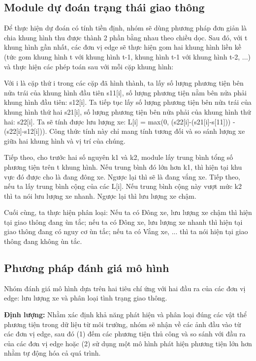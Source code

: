 \subsection{Module dự đoán trạng thái giao thông}

\quad Để thực hiện dự đoán có tính tiền định, nhóm sẽ dùng phương pháp đơn giản là chia khung hình thu được thành 2 phần bằng nhau theo chiều dọc. Sau đó, với t khung hình gần nhất, các đơn vị edge sẽ thực hiện gom hai khung hình liền kề (tức gom khung hình t với khung hình t-1, khung hình t-1 với khung hình t-2, ...) và thực hiện các phép toán sau với mỗi cặp khung hình:

\quad Với i là cặp thứ i trong các cặp đã hình thành, ta lấy số lượng phương tiện bên nửa trái của khung hình đầu tiên s11[i], số lượng phương tiện nằm bên nửa phải khung hình đầu tiên: s12[i]. Ta tiếp tục lấy số lượng phương tiện bên nửa trái của khung hình thứ hai s21[i], số lượng phương tiện bên nửa phải của khung hình thứ hai: s22[i]. Ta sẽ tính được lưu lượng xe: L[i] = max(0, (s22[i]-(s21[i]-s[11])) - (s22[i]-s12[i])). Công thức tính này chỉ mang tính tương đối và so sánh lượng xe giữa hai khung hình và vị trí của chúng.

\quad Tiếp theo, cho trước hai số nguyên k1 và k2, module lấy trung bình tổng số phương tiện trên t khung hình. Nếu trung bình đó lớn hơn k1, thì hiện tại khu vực đó được cho là đang đông xe. Ngược lại thì sẽ là đang vắng xe. Tiếp theo, nếu ta lấy trung bình cộng của các L[i]. Nếu trung bình cộng này vượt mức k2 thì ta nói lưu lượng xe nhanh. Ngược lại thì lưu lượng xe chậm.

\quad Cuối cùng, ta thực hiện phân loại: Nếu ta có {Đông xe, lưu lượng xe chậm} thì hiện tại giao thông đang ùn tắc; nếu ta có {Đông xe, lưu lượng xe nhanh} thì hiện tại giao thông đang có nguy cơ ùn tắc; nếu ta có {Vắng xe, ...} thì ta nói hiện tại giao thông đang không ùn tắc.

\subsection{Phương pháp đánh giá mô hình}
\quad Nhóm đánh giá mô hình dựa trên hai tiêu chí ứng với hai đầu ra của các đơn vị edge: lưu lượng xe và phân loại tình trạng giao thông.

\quad \textbf{Định lượng:} Nhằm xác định khả năng phát hiện và phân loại đúng các vật thể phương tiện trong dữ liệu từ môi trường, nhóm sẽ nhận về các ảnh đầu vào từ các đơn vị edge, sau đó (1) đếm các phương tiện thủ công và so sánh với đầu ra của các đơn vị edge hoặc (2) sử dụng một mô hình phát hiện phương tiện lớn hơn nhằm tự động hóa cả quá trình.

